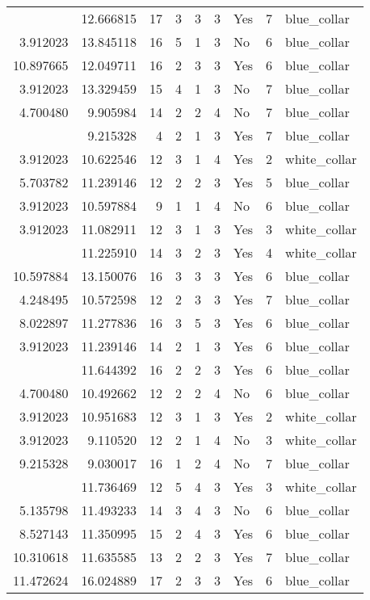 \documentclass[
]{article}
\begin{document}
\begin{longtable}[t]{rrrrrllrl}
\addlinespace
8.202482 & 12.666815 & 17 & 3 & 3 & 3 & Yes & 7 & blue\_collar\\
3.912023 & 13.845118 & 16 & 5 & 1 & 3 & No & 6 & blue\_collar\\
10.897665 & 12.049711 & 16 & 2 & 3 & 3 & Yes & 6 & blue\_collar\\
3.912023 & 13.329459 & 15 & 4 & 1 & 3 & No & 7 & blue\_collar\\
4.700480 & 9.905984 & 14 & 2 & 2 & 4 & No & 7 & blue\_collar\\
\addlinespace
3.912023 & 9.215328 & 4 & 2 & 1 & 3 & Yes & 7 & blue\_collar\\
3.912023 & 10.622546 & 12 & 3 & 1 & 4 & Yes & 2 & white\_collar\\
5.703782 & 11.239146 & 12 & 2 & 2 & 3 & Yes & 5 & blue\_collar\\
3.912023 & 10.597884 & 9 & 1 & 1 & 4 & No & 6 & blue\_collar\\
3.912023 & 11.082911 & 12 & 3 & 1 & 3 & Yes & 3 & white\_collar\\
\addlinespace
7.346010 & 11.225910 & 14 & 3 & 2 & 3 & Yes & 4 & white\_collar\\
10.597884 & 13.150076 & 16 & 3 & 3 & 3 & Yes & 6 & blue\_collar\\
4.248495 & 10.572598 & 12 & 2 & 3 & 3 & Yes & 7 & blue\_collar\\
8.022897 & 11.277836 & 16 & 3 & 5 & 3 & Yes & 6 & blue\_collar\\
3.912023 & 11.239146 & 14 & 2 & 1 & 3 & Yes & 6 & blue\_collar\\
\addlinespace
7.522941 & 11.644392 & 16 & 2 & 2 & 3 & Yes & 6 & blue\_collar\\
4.700480 & 10.492662 & 12 & 2 & 2 & 4 & No & 6 & blue\_collar\\
3.912023 & 10.951683 & 12 & 3 & 1 & 3 & Yes & 2 & white\_collar\\
3.912023 & 9.110520 & 12 & 2 & 1 & 4 & No & 3 & white\_collar\\
9.215328 & 9.030017 & 16 & 1 & 2 & 4 & No & 7 & blue\_collar\\
\addlinespace
10.128629 & 11.736469 & 12 & 5 & 4 & 3 & Yes & 3 & white\_collar\\
5.135798 & 11.493233 & 14 & 3 & 4 & 3 & No & 6 & blue\_collar\\
8.527143 & 11.350995 & 15 & 2 & 4 & 3 & Yes & 6 & blue\_collar\\
10.310618 & 11.635585 & 13 & 2 & 2 & 3 & Yes & 7 & blue\_collar\\
11.472624 & 16.024889 & 17 & 2 & 3 & 3 & Yes & 6 & blue\_collar\\

\end{longtable}
\end{document}
